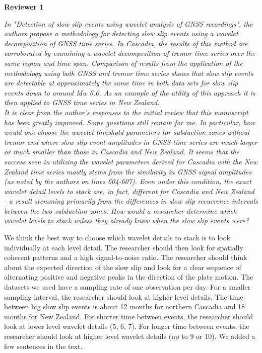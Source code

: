 \documentclass[letterpaper, 12pt]{article}
\begin{document}
\textbf{Reviewer 1}

\bigskip

\textit{In "Detection of slow slip events using wavelet analysis of GNSS recordings", the authors propose a methodology for detecting slow slip events using a wavelet decomposition of GNSS time series. In Cascadia, the results of this method are corroborated by examining a wavelet decomposition of tremor time series over the same region and time span. Comparison of results from the application of the methodology using both GNSS and tremor time series shows that slow slip events are detectable at approximately the same time in both data sets for slow slip events down to around Mw 6.0.  As an example of the utility of this approach it is then applied to GNSS time series in New Zealand.} \\

\textit{It is clear from the author's responses to the initial review that this manuscript has been greatly improved. Some questions still remain for me. In particular, how would one choose the wavelet threshold parameters for subduction zones without tremor and where slow slip event amplitudes in GNSS time series are much larger or much smaller than those in Cascadia and New Zealand. It seems that the success seen in utilizing the wavelet parameters derived for Cascadia with the New Zealand time series mostly stems from the similarity in GNSS signal amplitudes (as noted by the authors on lines 604-607). Even under this condition, the exact wavelet detail levels to stack are, in fact, different for Cascadia and New Zealand - a result stemming primarily from the differences in slow slip recurrence intervals between the two subduction zones. How would a researcher determine which wavelet levels to stack unless they already knew when the slow slip events were?}

\bigskip

We think the best way to choose which wavelet details to stack is to look individually at each level detail. The researcher should then look for spatially coherent patterns and a high signal-to-noise ratio. The researcher should think about the expected direction of the slow slip and look for a clear sequence of alternating positive and negative peaks in the direction of the plate motion. The datasets we used have a sampling rate of one observation per day. For a smaller sampling interval, the researcher should look at higher level details. The time between big slow slip events is about 12 months for northern Cascadia and 18 months for New Zealand. For shorter time between events, the researcher should look at lower level wavelet details (5, 6, 7). For longer time between events, the researcher should look at higher level wavelet details (up to 9 or 10). We added a few sentences in the text.
\end{document}
